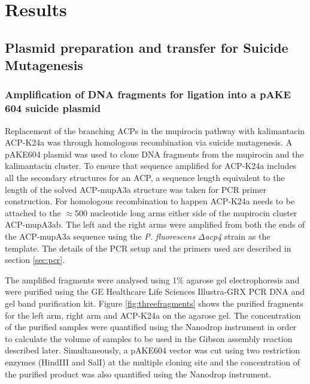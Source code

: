 \section{Results}
\label{sec:chap4-results}
	
	\subsection{Plasmid preparation and transfer for Suicide Mutagenesis}
	
	\subsubsection{Amplification of DNA fragments for ligation into a pAKE 604 suicide plasmid}
	\label{sec:chap4PCRresults}
	Replacement of the branching ACPs in the mupirocin pathway with kalimantacin ACP-K24a was through homologous recombination via suicide mutagenesis. A pAKE604 plasmid was used to clone DNA fragments from the mupirocin and the kalimantacin cluster. To ensure that sequence amplified for ACP-K24a includes all the secondary structures for an ACP, a sequence length equivalent to the length of the solved ACP-mupA3a structure was taken for PCR primer construction. For homologous recombination to happen ACP-K24a needs to be attached to the $ \approx$500 nucleotide long arms either side of the mupirocin cluster ACP-mupA3ab. The left and the right arms were amplified from both the ends of the ACP-mupA3a sequence using the \textit{P. fluorescens} $ \Delta $\textit{acp4} strain as the template. The details of the PCR setup and the primers used are described in section \ref{sec:pcr}. 
	
	The amplified fragments were analysed using 1\% agarose gel electrophoresis and were purified using the GE Healthcare Life Sciences Illustra-GRX PCR DNA and gel band purification kit. Figure \ref{fig:threefragments} shows the purified fragments for the left arm, right arm and ACP-K24a on the agarose gel. The concentration of the purified samples were quantified using the Nanodrop instrument in order to calculate the volume of samples to be used in the Gibson assembly reaction described later. Simultaneously, a pAKE604 vector was cut using two restriction enzymes (HindIII and SalI) at the multiple cloning site and the concentration of the purified product was also quantified using the Nanodrop instrument.  
	
